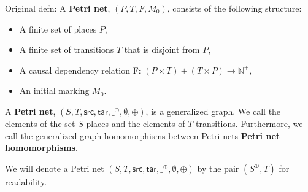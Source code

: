 \begin{definition}
  \label{def:Original-Petri-Net}
  Original defn: A \textbf{Petri net}, $(P, T, F, M_0)$, consists of the following structure:  
  \begin{itemize}
  \item A finite set of places $P$,
  \item A finite set of transitions $T$ that is disjoint from $P$,
  \item A causal dependency relation F: $(P \times T) + (T \times P) \to \mathbb{N}^+ $, 
  \item An initial marking $M_0$.
  \end{itemize}
\end{definition}
%
\begin{definition}
  \label{def:Petri-Net}
  A \textbf{Petri net}, $(S, T, \mathsf{src},
  \mathsf{tar},\_^{\oplus},\emptyset,\oplus)$, is a generalized graph.  We call
  the elements of the set $S$ places and the elements of $T$
  transitions.  Furthermore, we call the generalized graph
  homomorphisms between Petri nets \textbf{Petri net homomorphisms}.
\end{definition}
We will denote a Petri net $(S, T, \mathsf{src},
\mathsf{tar},\_^{\oplus},\emptyset,\oplus)$ by the pair $(S^\oplus,T)$ for
readability. %
%
